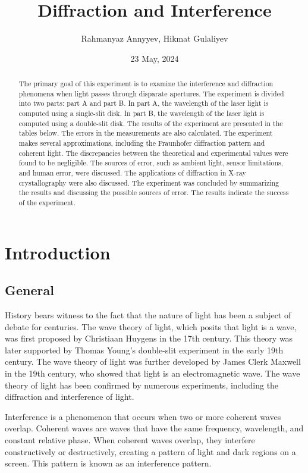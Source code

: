\documentclass[10pt]{article}
\title{Diffraction and Interference}
\author{Rahmanyaz Annyyev, Hikmat Gulaliyev}
\date{23 May, 2024}
\begin{document}
\maketitle

\begin{abstract}

The primary goal of this experiment is to examine the interference and diffraction phenomena when light passes through disparate apertures. The experiment is divided into two parts: part A and part B. In part A, the wavelength of the laser light is computed using a single-slit disk. In part B, the wavelength of the laser light is computed using a double-slit disk. The results of the experiment are presented in the tables below. The errors in the measurements are also calculated. The experiment makes several approximations, including the Fraunhofer diffraction pattern and coherent light. The discrepancies between the theoretical and experimental values were found to be negligible. The sources of error, such as ambient light, sensor limitations, and human error, were discussed. The applications of diffraction in X-ray crystallography were also discussed. The experiment was concluded by summarizing the results and discussing the possible sources of error. The results indicate the success of the experiment.

\end{abstract}

\section{Introduction}

\subsection*{General}

History bears witness to the fact that the nature of light has been a subject of debate for centuries. The wave theory of light, which posits that light is a wave, was first proposed by Christiaan Huygens in the 17th century. This theory was later supported by Thomas Young's double-slit experiment in the early 19th century. The wave theory of light was further developed by James Clerk Maxwell in the 19th century, who showed that light is an electromagnetic wave. The wave theory of light has been confirmed by numerous experiments, including the diffraction and interference of light.

Interference is a phenomenon that occurs when two or more coherent waves overlap. Coherent waves are waves that have the same frequency, wavelength, and constant relative phase. When coherent waves overlap, they interfere constructively or destructively, creating a pattern of light and dark regions on a screen. This pattern is known as an interference pattern.
\end{document}
